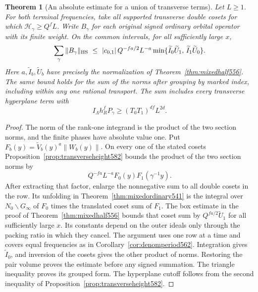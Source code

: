 \documentclass[a4paper,11pt]{article}
\newtheorem{theorem}[proposition]{Theorem}
\theoremstyle{definition}
\theoremstyle{remark}
\numberwithin{equation}{section}
\begin{document}
\begin{theorem}[An absolute estimate for a union of transverse terms]
\leavevmode\label{thm:transversesum582}
Let \(L\ge1\). For both terminal frequencies, take all supported
transverse double cosets for which \(\mathcal H_\gamma\ge Q^f L\).
Write \(B_\gamma\) for each original signed ordinary orbital
operator with its finite weight. On the common intervals, for
all sufficiently large \(x\),
\[
 \sum_\gamma\|B_\gamma\|_{\rm HS}
 \ \le\
 |c_{0,1}|\,Q^{-fa/2}L^{-a}
       \min\{\widetilde I_0\widetilde U_1,\,
                     \widetilde I_1\widetilde U_0\}.
\]
Here \(a,\widetilde I_b,\widetilde U_b\) have precisely the
normalization of Theorem~\ref{thm:mixedhalf556}. The same bound
holds for the sum of the norms after grouping by marked index,
including within any one rational transport. The sum includes
every transverse hyperplane term with
\[
         I_\Lambda h_R^f P_\gamma\ge
                    (T_0T_1)^{df} L^{2d}.
\]
\end{theorem}
\begin{proof}
The norm of the rank-one integrand is the product of the two
section norms, and the finite phases have absolute value one.
Put \(F_b(y)=\widetilde V_b(y)^a\|W_b(y)\|\). On every one
of the stated cosets Proposition~\ref{prop:transverseheight582}
bounds the product of the two section norms by
\[
             Q^{-fa}L^{-a} F_0(y)F_1(\gamma^{-1}y).
\]
After extracting that factor, enlarge the nonnegative sum to
all double cosets in the row. Its unfolding in
Theorem~\ref{thm:mixedordinary541} is the integral over
\(N_0\backslash G_\infty\) of \(F_0\) times the translated
coset sum of \(F_1\). The box estimate in the proof of
Theorem~\ref{thm:mixedhalf556} bounds that coset sum by
\(Q^{fa/2}\widetilde U_1\) for all sufficiently large \(x\).
Its constants depend on the outer ideals only through the
packing ratio in which they cancel. The argument uses one
row at a time and covers equal frequencies as in
Corollary~\ref{cor:denomperiod562}. Integration gives
\(\widetilde I_0\), and inversion of the cosets gives the
other product of norms. Restoring the pair volume proves the
estimate before any signed summation. The triangle inequality
proves its grouped form. The hyperplane cutoff follows from the
second inequality of Proposition~\ref{prop:transverseheight582}.
\end{proof}
\end{document}
